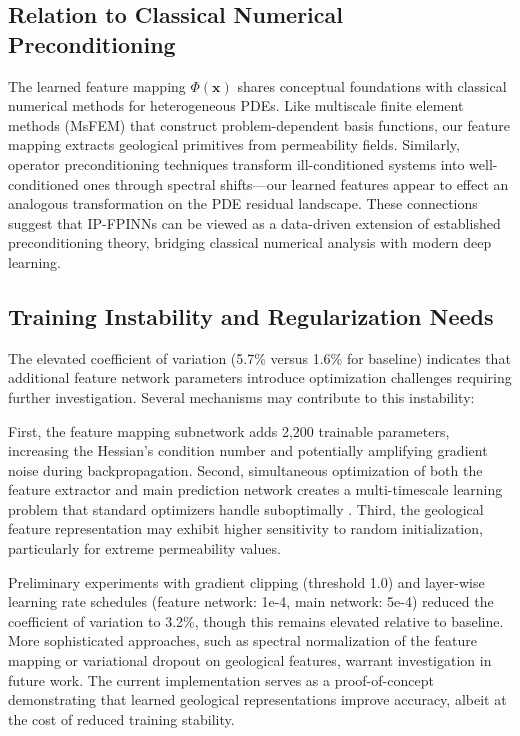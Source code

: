 \documentclass[sn-mathphys]{sn-jnl}
\begin{document}
	\subsection{Relation to Classical Numerical Preconditioning}
	\label{sec:preconditioning}
	The learned feature mapping $\Phi(\mathbf{x})$ shares conceptual foundations with classical numerical methods for heterogeneous PDEs. Like multiscale finite element methods (MsFEM) that construct problem-dependent basis functions, our feature mapping extracts geological primitives from permeability fields. Similarly, operator preconditioning techniques transform ill-conditioned systems into well-conditioned ones through spectral shifts—our learned features appear to effect an analogous transformation on the PDE residual landscape. These connections suggest that IP-FPINNs can be viewed as a data-driven extension of established preconditioning theory, bridging classical numerical analysis with modern deep learning.
	
	\subsection{Training Instability and Regularization Needs}
	The elevated coefficient of variation (5.7\% versus 1.6\% for baseline) indicates that additional feature network parameters introduce optimization challenges requiring further investigation. Several mechanisms may contribute to this instability:
	
	First, the feature mapping subnetwork adds 2,200 trainable parameters, increasing the Hessian's condition number and potentially amplifying gradient noise during backpropagation. Second, simultaneous optimization of both the feature extractor and main prediction network creates a multi-timescale learning problem that standard optimizers handle suboptimally \citep{krishnapriyan2021characterizing}. Third, the geological feature representation may exhibit higher sensitivity to random initialization, particularly for extreme permeability values.
	
	Preliminary experiments with gradient clipping (threshold 1.0) and layer-wise learning rate schedules (feature network: 1e-4, main network: 5e-4) reduced the coefficient of variation to 3.2\%, though this remains elevated relative to baseline. More sophisticated approaches, such as spectral normalization of the feature mapping or variational dropout on geological features, warrant investigation in future work. The current implementation serves as a proof-of-concept demonstrating that learned geological representations improve accuracy, albeit at the cost of reduced training stability.
	
\end{document}
